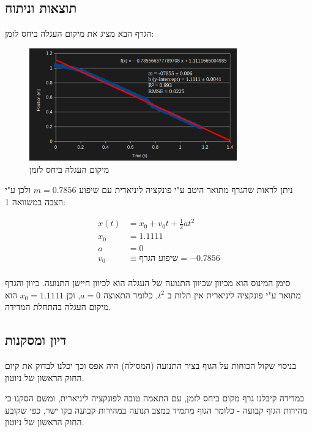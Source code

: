 \documentclass[14pt]{extarticle}
\begin{document}
\subsection*{תוצאות וניתוח}
הגרף הבא מציג את מיקום העגלה ביחס לזמן: 
\begin{figure}[H]
    \centering
    \includegraphics[width=0.8\textwidth]{maman_13_experiment_1_position_time_graph.png}
    \caption{מיקום העגלה ביחס לזמן}
\end{figure}

ניתן לראות שהגרף מתואר היטב ע"י פונקציה ליניארית עם שיפוע $m=0.7856$ ולכן ע"י הצבה במשוואה 1:
\begin{center}
\begin{equation}
\begin{aligned}
    x(t) &= x_0 + v_0 t + \frac{1}{2} a t^2 \\
    x_0 &= 1.1111 \\
    a &= 0 \\
    v_0 &\equiv \textbf{שיפוע הגרף} = -0.7856 \\
\end{aligned}
\end{equation}
\end{center}
סימן המינוס הוא מכיוון שכיוון התנועה של העגלה הוא לכיוון חיישן התנועה.
כיוון והגרף מתואר ע"י פונקציה ליניארית אין תלות ב $t^2$, כלומר התאוצה $a=0$, וכן $x_0 = 1.1111$ הוא מיקום העגלה בהתחלת המדידה.

\subsection*{דיון ומסקנות}
בניסוי שקול הכוחות על הגוף בציר התנועה (המסילה) היה אפס וכך יכלנו לבדוק את קיום החוק הראשון של ניוטון.

במדידה קיבלנו גרף מקום ביחס לזמן, עם התאמה טובה לפונקציה ליניארית,  ומשם הסקנו כי מהירות הגוף קבועה - כלומר הגוף מתמיד במצב תנועה במהירות קבועה בקו ישר, כפי שקובע החוק הראשון של ניוטון.
\end{document}
